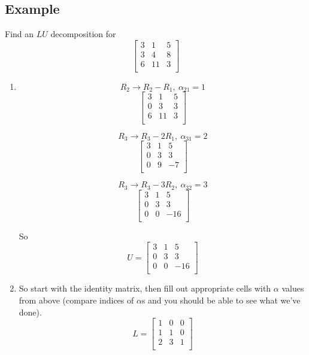 \documentclass[11pt]{article}
\begin{document}
\subsection{Example}
Find an $LU$ decomposition for
\[ \begin{bmatrix}
3 & 1 & 5 \\
3 & 4 & 8 \\
6 & 11 & 3 \\
\end{bmatrix} \]

\begin{enumerate}[ (i) ]
\item
\[ R_2 \rightarrow R_2 - R_1,\ \alpha_{21} = 1  \]
\[ \begin{bmatrix}
3 & 1 & 5 \\
0 & 3 & 3 \\
6 & 11 & 3 \\
\end{bmatrix} \]

\[ R_3 \rightarrow R_3 - 2R_1,\ \alpha_{31} = 2 \]
\[ \begin{bmatrix}
3 & 1 & 5 \\
0 & 3 & 3 \\
0 & 9 & -7 \\
\end{bmatrix} \]

\[ R_3 \rightarrow R_3 - 3R_2,\ \alpha_{32}= 3 \]
\[ \begin{bmatrix}
3 & 1 & 5 \\
0 & 3 & 3 \\
0 & 0 & -16 \\
\end{bmatrix} \]

So
\[ U = \begin{bmatrix}
3 & 1 & 5 \\
0 & 3 & 3 \\
0 & 0 & -16 \\
\end{bmatrix} \]

\item
So start with the identity matrix, then fill out appropriate cells with $\alpha$ values from above (compare indices of $\alpha$s and you should be able to see what we've done).
\[
L = \begin{bmatrix}
1 & 0 & 0 \\
1 & 1 & 0 \\
2 & 3 & 1 \\
\end{bmatrix}
\]


\end{enumerate}
\end{document}
